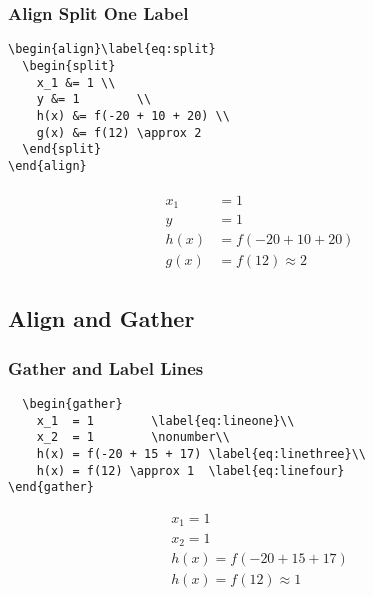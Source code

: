\documentclass[12pt,english]{article}
\begin{document}
\subsubsection{Align Split One Label}
\begin{verbatim}
\begin{align}\label{eq:split}
  \begin{split}
    x_1 &= 1 \\
    y &= 1        \\
    h(x) &= f(-20 + 10 + 20) \\
    g(x) &= f(12) \approx 2
  \end{split}
\end{align}
\end{verbatim}
\begin{align}\label{eq:split}
  \begin{split}
    x_1 &= 1 \\
    y &= 1        \\
    h(x) &= f(-20 + 10 + 20) \\
    g(x) &= f(12) \approx 2
  \end{split}
\end{align}

\pagebreak
\subsection{Align and Gather}
\subsubsection{Gather and Label Lines}
\begin{verbatim}
  \begin{gather}
    x_1  = 1        \label{eq:lineone}\\
    x_2  = 1        \nonumber\\
    h(x) = f(-20 + 15 + 17) \label{eq:linethree}\\
    h(x) = f(12) \approx 1  \label{eq:linefour}
\end{gather}
\end{verbatim}
\begin{gather}
  x_1  = 1        \label{eq:lineone}\\
  x_2  = 1        \nonumber\\
  h(x) = f(-20 + 15 + 17) \label{eq:linethree}\\
  h(x) = f(12) \approx 1  \label{eq:linefour}
\end{gather}
\end{document}
